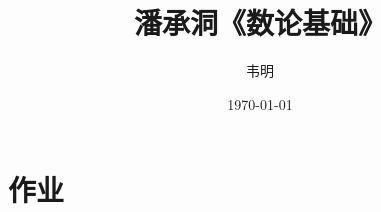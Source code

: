 \documentclass[12pt,lang=cn,thmcnt=subsection,pad]{elegantbook}
\title{潘承洞《数论基础》}
\author{韦明}
\date{\today}
\numberwithin{equation}{section}
\begin{document}
\maketitle
\frontmatter
%

\tableofcontents

\mainmatter
\chapter{作业}
%

\end{document}
